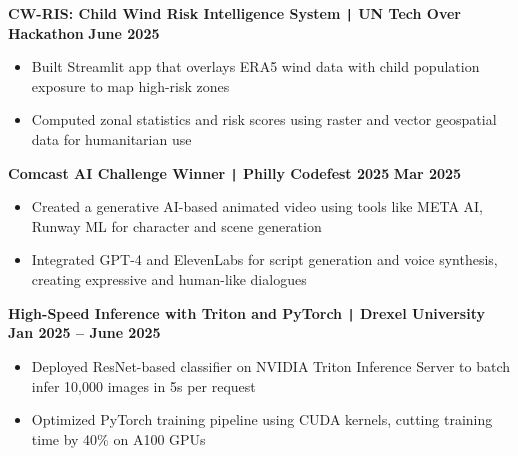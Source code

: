 \documentclass[10pt]{article}
\begin{document}
\noindent
\textbf{CW-RIS: Child Wind Risk Intelligence System \texttt{|} UN Tech Over Hackathon} \hfill \textbf{June 2025} \\
\vspace{-0.4cm}
\begin{itemize}[leftmargin=0.6cm, itemsep=-0.1cm, topsep=0cm]

    \item Built Streamlit app that overlays ERA5 wind data with child population exposure to map high-risk zones

    \item Computed zonal statistics and risk scores using raster and vector geospatial data for humanitarian use

\end{itemize}

\noindent
\textbf{Comcast AI Challenge Winner \texttt{|} Philly Codefest 2025} \hfill \textbf{Mar 2025} \\
\vspace{-0.4cm}
\begin{itemize}[leftmargin=0.6cm, itemsep=-0.1cm, topsep=0cm]

    \item Created a generative AI-based animated video using tools like META AI, Runway ML for character and scene generation

    \item Integrated GPT-4 and ElevenLabs for script generation and voice synthesis, creating expressive and human-like dialogues

\end{itemize}

\noindent
\textbf{High-Speed Inference with Triton and PyTorch \texttt{|} Drexel University} \hfill \textbf{Jan 2025 -- June 2025} \\
\vspace{-0.4cm}
\begin{itemize}[leftmargin=0.6cm, itemsep=-0.1cm, topsep=0cm]

    \item Deployed ResNet-based classifier on NVIDIA Triton Inference Server to batch infer 10,000 images in 5s per request

    \item Optimized PyTorch training pipeline using CUDA kernels, cutting training time by 40\% on A100 GPUs

\end{itemize}


\vspace{-0.4cm}
\end{document}
